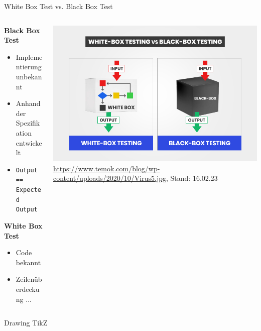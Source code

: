 \begin{frame}{White Box Test vs. Black Box Test}
	\begin{columns}
		\begin{column}{0.55\textwidth}
			\textbf{Black Box Test}\\
			\begin{itemize}
				\item Implementierung unbekannt
				\item Anhand der Spezifikation entwickelt
				\item \texttt{Output == Expected Output}
			\end{itemize}
			\vspace{0.1cm}

			\pause

			\textbf{White Box Test}\\
			\begin{itemize}
				\item Code bekannt
				\item Zeilenüberdeckung ...
			\end{itemize}
		\end{column}
		\begin{column}{0.55\textwidth}

			\pause

			\begin{center}
				\includegraphics[width=\textwidth]{ressources/imgs/sample.jpg}
				{\tiny \url{https://www.temok.com/blog/wp-content/uploads/2020/10/Virus5.jpg}, Stand: 16.02.23}
			\end{center}

		\end{column}
	\end{columns}
\end{frame}



\begin{frame}{Drawing TikZ}
	\resizebox{\textwidth}{!}{
    	
	}
\end{frame}
